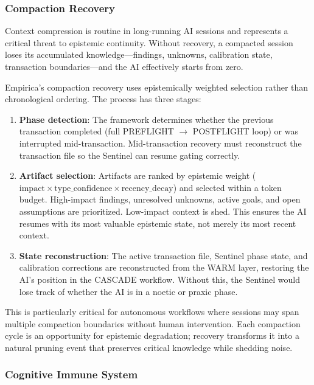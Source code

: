 \subsubsection{Compaction Recovery}

Context compression is routine in long-running AI sessions and represents a critical threat to epistemic continuity. Without recovery, a compacted session loses its accumulated knowledge---findings, unknowns, calibration state, transaction boundaries---and the AI effectively starts from zero.

Empirica's compaction recovery uses epistemically weighted selection rather than chronological ordering. The process has three stages:

\begin{enumerate}
    \item \textbf{Phase detection}: The framework determines whether the previous transaction completed (full PREFLIGHT $\rightarrow$ POSTFLIGHT loop) or was interrupted mid-transaction. Mid-transaction recovery must reconstruct the transaction file so the Sentinel can resume gating correctly.

    \item \textbf{Artifact selection}: Artifacts are ranked by epistemic weight ($\text{impact} \times \text{type\_confidence} \times \text{recency\_decay}$) and selected within a token budget. High-impact findings, unresolved unknowns, active goals, and open assumptions are prioritized. Low-impact context is shed. This ensures the AI resumes with its most valuable epistemic state, not merely its most recent context.

    \item \textbf{State reconstruction}: The active transaction file, Sentinel phase state, and calibration corrections are reconstructed from the WARM layer, restoring the AI's position in the CASCADE workflow. Without this, the Sentinel would lose track of whether the AI is in a noetic or praxic phase.
\end{enumerate}

This is particularly critical for autonomous workflows where sessions may span multiple compaction boundaries without human intervention. Each compaction cycle is an opportunity for epistemic degradation; recovery transforms it into a natural pruning event that preserves critical knowledge while shedding noise.

\subsubsection{Cognitive Immune System}

